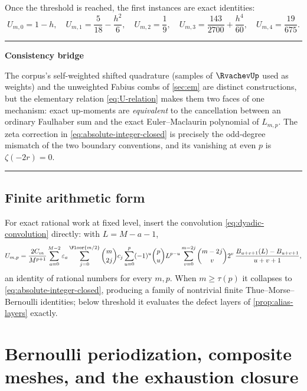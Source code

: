 \documentclass[11pt,oneside]{article}
\numberwithin{equation}{section}
\theoremstyle{definition}
\theoremstyle{remark}
\newcommand{\eps}{\varepsilon}
\newenvironment{statusbox}[1]{%
  \par\smallskip\noindent\begin{center}\begin{minipage}{0.94\textwidth}%
  \hrule\vspace{0.5em}\noindent\textbf{#1}\par\smallskip
}{%
  \vspace{0.5em}\hrule\end{minipage}\end{center}\smallskip
}
\begin{document}
Once the threshold is reached, the first instances are exact
identities:
\begin{equation}
 U_{m,0}=1-h,\quad
 U_{m,1}=\frac5{18}-\frac{h^{2}}{6},\quad
 U_{m,2}=\frac19,\quad
 U_{m,3}=\frac{143}{2700}+\frac{h^{4}}{60},\quad
 U_{m,4}=\frac{19}{675}.
 \label{eq:U-low}
\end{equation}

\begin{statusbox}{Consistency bridge}
The corpus's self-weighted shifted quadrature (samples of $\RvachevUp$ used as
weights) and the unweighted Fabius combs of \cref{sec:em} are distinct
constructions, but the elementary relation
\eqref{eq:U-relation} makes them two faces of one mechanism: exact
up-moments are \emph{equivalent} to the cancellation between an
ordinary Faulhaber sum and the exact Euler--Maclaurin polynomial of
$L_{m,p}$.  The zeta correction in
\eqref{eq:absolute-integer-closed} is precisely the odd-degree
mismatch of the two boundary conventions, and its vanishing at even
$p$ is $\zeta(-2r)=0$.
\end{statusbox}

\subsection{Finite arithmetic form}

For exact rational work at fixed level, insert the convolution
\eqref{eq:dyadic-convolution} directly: with $L=M-a-1$,
\begin{equation}
 U_{m,p}=\frac{2C_m}{M^{p+1}}
 \sum_{a=0}^{M-2}\eps_a
 \sum_{j=0}^{\Floor{m/2}}\binom m{2j}c_j
 \sum_{u=0}^{p}(-1)^{u}\binom pu L^{p-u}
 \sum_{v=0}^{m-2j}\binom{m-2j}{v}2^{v}\,
 \frac{B_{u+v+1}(L)-B_{u+v+1}}{u+v+1},
 \label{eq:absolute-Bernoulli}
\end{equation}
an identity of rational numbers for every $m,p$.  When
$m\ge\tau(p)$ it collapses to \eqref{eq:absolute-integer-closed},
producing a family of nontrivial finite Thue--Morse--Bernoulli
identities; below threshold it evaluates the defect layers of
\cref{prop:alias-layers} exactly.

\section{Bernoulli periodization, composite meshes, and the exhaustion
closure}
\label{sec:periodized}
\end{document}
